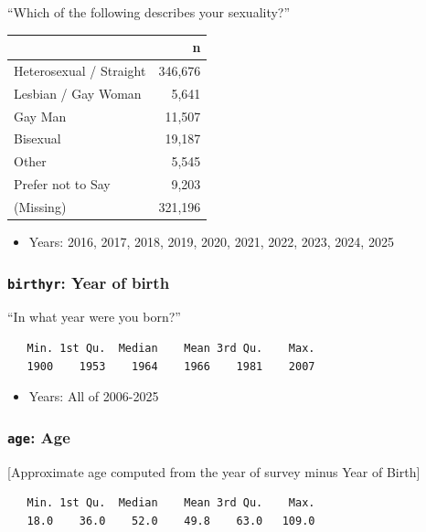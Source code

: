 \documentclass[10pt,article,oneside]{memoir}
\begin{document}
``Which of the following describes your sexuality?''

\begin{table}[H]
\centering
\begin{tabular}[t]{lr}
\toprule
 & n\\
\midrule
Heterosexual / Straight & 346,676\\
Lesbian / Gay Woman & 5,641\\
Gay Man & 11,507\\
Bisexual & 19,187\\
Other & 5,545\\
Prefer not to Say & 9,203\\
(Missing) & 321,196\\
\bottomrule
\end{tabular}
\end{table}

\begin{itemize}
\tightlist
\item
  Years: 2016, 2017, 2018, 2019, 2020, 2021, 2022, 2023, 2024, 2025
\end{itemize}

\subsubsection{\texorpdfstring{\texttt{birthyr}: Year of
birth}{birthyr: Year of birth}}\label{birthyr-year-of-birth}

``In what year were you born?''

\begin{verbatim}
   Min. 1st Qu.  Median    Mean 3rd Qu.    Max. 
   1900    1953    1964    1966    1981    2007 
\end{verbatim}

\begin{itemize}
\tightlist
\item
  Years: All of 2006-2025
\end{itemize}

\subsubsection{\texorpdfstring{\texttt{age}:
Age}{age: Age}}\label{age-age}

{[}Approximate age computed from the year of survey minus Year of
Birth{]}

\begin{verbatim}
   Min. 1st Qu.  Median    Mean 3rd Qu.    Max. 
   18.0    36.0    52.0    49.8    63.0   109.0 
\end{verbatim}
\end{document}
